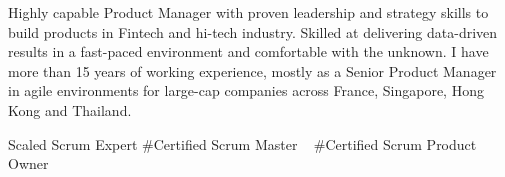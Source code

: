 

\begin{cvparagraph}


Highly capable Product Manager with proven leadership and strategy skills to build products in Fintech and hi-tech industry. Skilled at delivering data-driven results in a fast-paced environment and comfortable with the unknown. I have more than 15 years of working experience, mostly as a Senior Product Manager in agile environments for large-cap companies across France, Singapore, Hong Kong and Thailand.
\newline

\end{cvparagraph}
\begin{cvtechnologies}
 \Certified Scaled Scrum Expert  
 \#Certified Scrum Master ~
 \#Certified Scrum Product Owner ~
\end{cvtechnologies}

